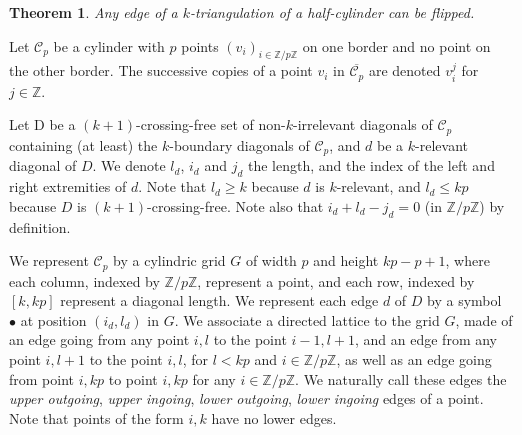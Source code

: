 \documentclass{amsart}
\newtheorem{theorem}{Theorem}[section]
\theoremstyle{remark}
\begin{document}
\begin{theorem}\label{thm:flipHalfCylinder}
Any edge of a $k$-triangulation of a half-cylinder can be flipped.
\end{theorem}

Let $\mathcal{C}_p$ be a cylinder with $p$ points $(v_i)_{i\in\mathbb{Z}/p\mathbb{Z}}$ on one border and no point on the other border. 
The successive copies of a point $v_i$ in $\overline{\mathcal{C}_p}$ are denoted $v_i^j$ for $j\in\mathbb{Z}$.

Let D be a $(k+1)$-crossing-free set of non-$k$-irrelevant diagonals of $\mathcal{C}_p$ containing (at least) the $k$-boundary diagonals of $\mathcal{C}_p$, and $d$ be a $k$-relevant diagonal of $D$. We denote $l_d$, $i_d$ and $j_d$ the length, and the index of the left and right extremities of $d$. Note that $l_d\geq k$ because $d$ is $k$-relevant, and $l_d\leq kp$ because $D$ is $(k+1)$-crossing-free. Note also that $i_d+l_d-j_d=0$ (in $\mathbb{Z}/p\mathbb{Z}$) by definition.

We represent $\mathcal{C}_p$ by a cylindric grid $G$ of width $p$ and height $kp-p+1$, where each column, indexed by $\mathbb{Z}/p\mathbb{Z}$, represent a point, and each row, indexed by $[k,kp]$ represent a diagonal length.
We represent each edge $d$ of $D$ by a symbol $\bullet$ at position $(i_d,l_d)$ in $G$.
We associate a directed lattice to the grid $G$, made of an edge going from any point $i,l$ to the point $i-1,l+1$, and an edge from any point $i,l+1$ to the point $i,l$, for $l<kp$ and $i\in\mathbb{Z}/p\mathbb{Z}$, as well as an edge going from point $i,kp$ to point $i,kp$ for any $i\in\mathbb{Z}/p\mathbb{Z}$.
We naturally call these edges the \emph{upper outgoing}, \emph{upper ingoing}, \emph{lower outgoing}, \emph{lower ingoing} edges of a point. Note that points of the form $i,k$ have no lower edges.
\end{document}
